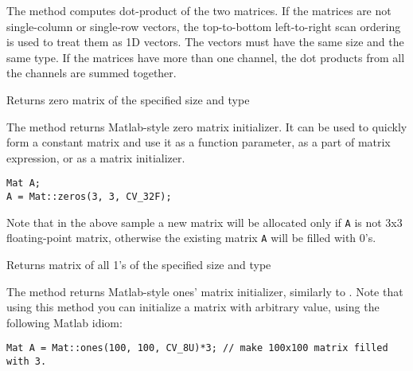 The method computes dot-product of the two matrices. If the matrices are not single-column or single-row vectors, the top-to-bottom left-to-right scan ordering is used to treat them as 1D vectors. The vectors must have the same size and the same type. If the matrices have more than one channel, the dot products from all the channels are summed together. 

Returns zero matrix of the specified size and type

\begin{description}
\end{description}

The method returns Matlab-style zero matrix initializer. It can be used to quickly form a constant matrix and use it as a function parameter, as a part of matrix expression, or as a matrix initializer.

\begin{lstlisting}
Mat A;
A = Mat::zeros(3, 3, CV_32F);
\end{lstlisting}

Note that in the above sample a new matrix will be allocated only if \texttt{A} is not 3x3 floating-point matrix, otherwise the existing matrix \texttt{A} will be filled with 0's.


Returns matrix of all 1's of the specified size and type

\begin{description}
\end{description}

The method returns Matlab-style ones' matrix initializer, similarly to . Note that using this method you can initialize a matrix with arbitrary value, using the following Matlab idiom:

\begin{lstlisting}
Mat A = Mat::ones(100, 100, CV_8U)*3; // make 100x100 matrix filled with 3.
\end{lstlisting}

